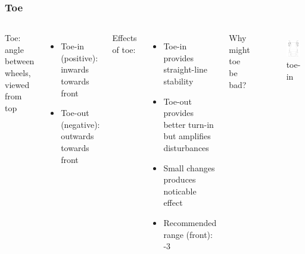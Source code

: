 \documentclass{beamer}
\begin{document}
\begin{frame}
\frametitle{Toe}
\begin{columns}[t]
  Toe: angle between wheels, viewed from top
  \begin{itemize}
    \item Toe-in (positive): inwards towards front
    \item Toe-out (negative): outwards towards front
  \end{itemize}
  \vspace{\baselineskip}
  Effects of toe:
  \begin{itemize}
    \item Toe-in provides straight-line stability
    \item Toe-out provides better turn-in but amplifies disturbances
    \item Small changes produces noticable effect
    \item Recommended range (front): -3\textdegree
  \end{itemize}  
  \vspace{\baselineskip}
  Why might toe be bad?
  \begin{figure}
    \centering
    \vspace{-1.5\baselineskip}
    \includegraphics[scale=0.3]{images-dis12/car-top-toe-in} \\
    toe-in \\

\end{figure}
\end{columns}
\end{frame}
\end{document}

